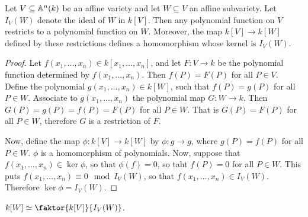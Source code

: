 \begin{proposition}\label{proposition_11.1.3}
  Let $V \subseteq \mathbb{A}^n(k)$ be an affine variety and let $W
  \subseteq V$ an affine subvariety. Let $I_V(W)$ denote the ideal
  of $W$ in $k[V]$. Then any polynomial function on $V$ restricts to
  a polynomial function on $W$. Moreover, the map $k[V]
  \xrightarrow{} k[W]$ defined by these restrictions defines a
  homomorphism whose kernel is $I_V(W)$.
\end{proposition}
\begin{proof}
  Let $f(x_1, \dots, x_n) \in k[x_1, \dots, x_n]$, and let $F:V
  \xrightarrow{} k$ be the polynomial function determined by $f(x_1,
  \dots, x_n)$. Then $f(P)=F(P)$ for all $P \in V$. Define the
  polynomial $g(x_1, \dots, x_n) \in k[W]$, such that $f(P)=g(P)$
  for all $P \in W$. Associate to $g(x_1, \dots, x_n)$ the
  polynomial map $G:W \xrightarrow{} k$. Then $G(P)=g(P)=f(P)=F(P)$
  for all $P \in W$. That is $G(P)=F(P)$ for all $P \in W$,
  therefore $G$ is a restriction of $F$.

  Now, define the map $\phi:k[V] \xrightarrow{} k[W]$ by $\phi:g
  \xrightarrow{} g$, where $g(P)=f(P)$ for all $P \in W$. $\phi$ is
  a homomorphism of polynomials. Now, suppose that $f(x_1, \dots,
  x_n) \in \ker{\phi}$, so that $\phi(f)=0$, so taht $f(P)=0$ for
  all $P \in W$. This puts $f(x_1, \dots, x_n) \equiv 0
  \mod{I_V(W)}$, so that $f(x_1, \dots, x_n) \in I_V(W)$. Therefore
  $\ker{\phi}=I_V(W)$.
\end{proof}
\begin{corollary}
  $k[W] \simeq \faktor{k[V]}{I_V(W)}$.
\end{corollary}

